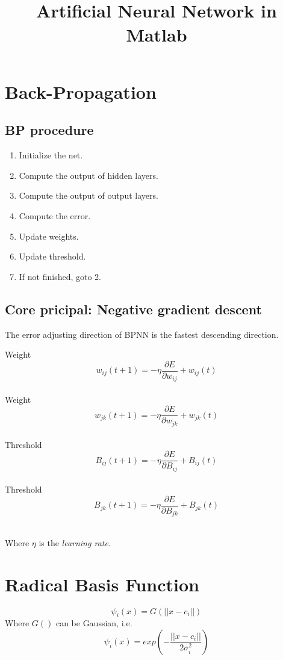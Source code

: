 \documentclass[a4paper,10pt]{article}
\title{\hrulefill \\Artificial Neural Network in Matlab\\ \hrulefill}
\begin{document}
\maketitle

\section{Back-Propagation}
	\subsection{BP procedure}
		\begin{enumerate}
		\item Initialize the net.
		\item Compute the output of hidden layers.
		\item Compute the output of output layers.
		\item Compute the error.
		\item Update weights.
		\item Update threshold.
		\item If not finished, goto 2.
		\end{enumerate}
	\subsection{Core pricipal: Negative gradient descent}
		The error adjusting direction of BPNN is the fastest descending direction.
		\begin{multicols}{2}
			\flushleft
			Weight
			\[ w_{ij} (t+1) = -\eta \frac{\partial E}{\partial w_{ij}} + w_{ij}(t) \]\\
			Weight
			\[ w_{jk} (t+1) = -\eta \frac{\partial E}{\partial w_{jk}} + w_{jk}(t) \]\\
			Threshold
			\[ B_{ij} (t+1) = -\eta \frac{\partial E}{\partial B_{ij}} + B_{ij}(t) \]\\
			Threshold
			\[ B_{jk} (t+1) = -\eta \frac{\partial E}{\partial B_{jk}} + B_{jk}(t) \]\\
		\end{multicols}
		Where $\eta$ is the \emph{learning rate}.

\section{Radical Basis Function}
	\[ \psi_i (x) = G( || x - c_i || ) \]
	Where $G()$ can be Gaussian, i.e.
	\[ \psi_i(x) = exp( - \frac {||x-c_i||}{2\sigma_i^2} ) \]
\end{document}
